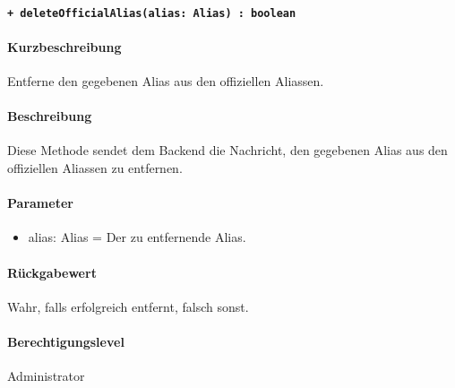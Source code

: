 \paragraph{\texttt{+ deleteOfficialAlias(alias: Alias) : boolean}}%
\paragraph*{Kurzbeschreibung}
Entferne den gegebenen Alias aus den offiziellen Aliassen.
\paragraph*{Beschreibung}
Diese Methode sendet dem Backend die Nachricht, den gegebenen Alias aus den offiziellen Aliassen zu entfernen.
\paragraph*{Parameter}
\begin{itemize}
    \item alias: Alias = Der zu entfernende Alias.
\end{itemize}
\paragraph*{Rückgabewert}
Wahr, falls erfolgreich entfernt, falsch sonst.
\paragraph*{Berechtigungslevel}
Administrator